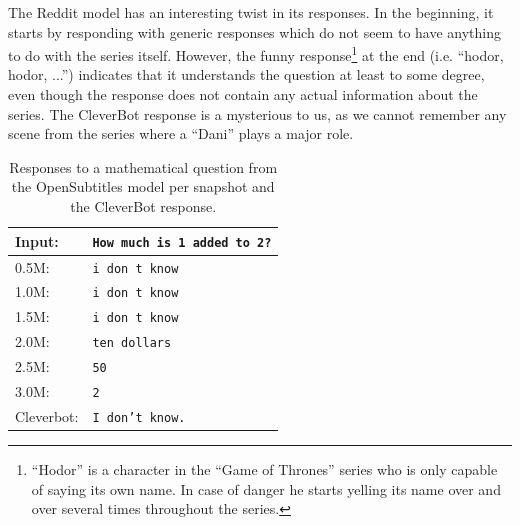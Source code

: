 The Reddit model has an interesting twist in its responses. In the beginning, it starts by responding with generic responses which do not seem to have anything to do with the series itself. However, the funny response\footnote{``Hodor'' is a character in the ``Game of Thrones'' series who is only capable of saying its own name. In case of danger he starts yelling its name over and over several times throughout the series.} at the end (i.e. ``hodor, hodor, ...'') indicates that it understands the question at least to some degree, even though the response does not contain any actual information about the series. The CleverBot response is a mysterious to us, as we cannot remember any scene from the series where a ``Dani'' plays a major role.
\\
\begin{table}[H]
	\centering
	\begin{adjustbox}{max width=\textwidth}
		\begin{tabular}{ll}
			\toprule
			Input: 	& \texttt{How much is 1 added to 2?}\\
			\midrule
			0.5M: 	& \texttt{i don t know}\\
			1.0M: 	& \texttt{i don t know}\\
			1.5M:	& \texttt{i don t know}\\
			2.0M:	& \texttt{ten dollars}\\
			2.5M:	& \texttt{50}\\
			3.0M:	& \texttt{2}\\
			Cleverbot:	& \texttt{I don't know.}\\
			\bottomrule
		\end{tabular}
	\end{adjustbox}
	\caption{Responses to a mathematical question from the OpenSubtitles model per snapshot and the CleverBot response.}
	\label{results:example5_output:OpenSubtitle_compared}
\end{table}
